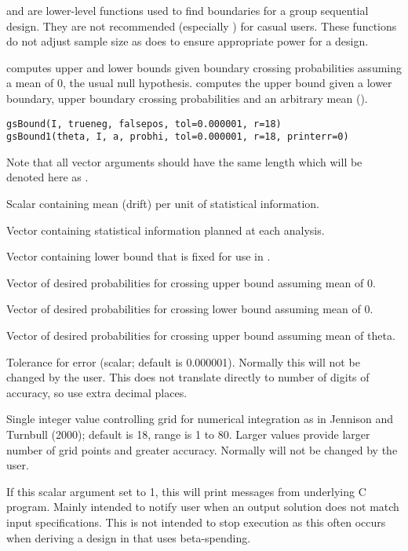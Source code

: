 \begin{Description}\relax
{} and  are lower-level functions used to find boundaries for a group sequential design.
They are not recommended (especially ) for casual users.
These functions do not adjust sample size as  does to ensure appropriate power for a design.

 computes upper and lower bounds given boundary crossing probabilities assuming a mean of 0, the usual null hypothesis.
 computes the upper bound given a lower boundary, upper boundary crossing probabilities and an arbitrary mean ().
\end{Description}
\begin{Usage}
\begin{verbatim}
gsBound(I, trueneg, falsepos, tol=0.000001, r=18)
gsBound1(theta, I, a, probhi, tol=0.000001, r=18, printerr=0)
\end{verbatim}
\end{Usage}
\begin{Arguments}
Note that all vector arguments should have the same length which will be denoted here as .
\begin{ldescription}
\item[\code{theta}] Scalar containing mean (drift) per unit of statistical information.
\item[\code{I}] Vector containing statistical information planned at each analysis.
\item[\code{a}] Vector containing lower bound that is fixed for use in .
\item[\code{trueneg}] Vector of desired probabilities for crossing upper bound assuming mean of 0.
\item[\code{falsepos}] Vector of desired probabilities for crossing lower bound assuming mean of 0.
\item[\code{probhi}] Vector of desired probabilities for crossing upper bound assuming mean of theta.
\item[\code{tol}] Tolerance for error (scalar; default is 0.000001). Normally this will not be changed by the user.
This does not translate directly to number of digits of accuracy, so use extra decimal places.
\item[\code{r}] Single integer value controlling grid for numerical integration as in Jennison and Turnbull (2000); 
default is 18, range is 1 to 80. 
Larger values provide larger number of grid points and greater accuracy.
Normally  will not be changed by the user.
\item[\code{printerr}] If this scalar argument set to 1, this will print messages from underlying C program.
Mainly intended to notify user when an output solution does not match input specifications.
This is not intended to stop execution as this often occurs when deriving a design in 
that uses beta-spending.
\end{ldescription}
\end{Arguments}
